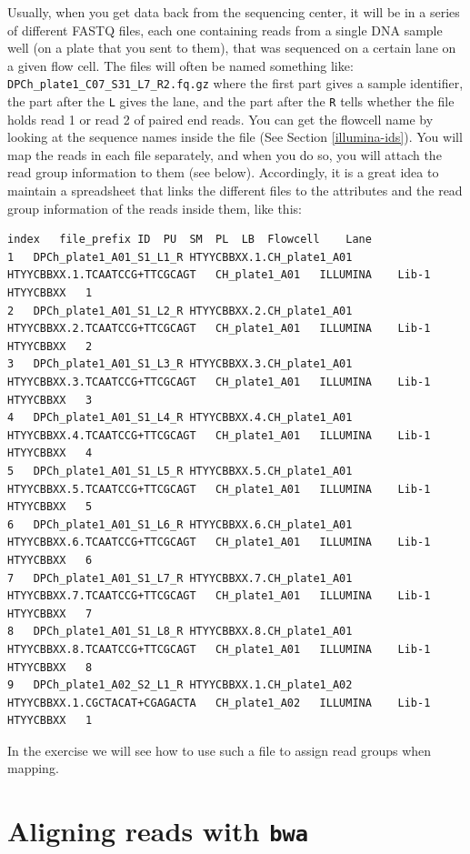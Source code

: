 \documentclass[]{krantz}
\begin{document}
Usually, when you get data back from the sequencing center, it will be in a series
of different FASTQ files, each one containing reads from a single DNA sample well (on a plate
that you sent to them), that was sequenced on a certain lane on a given flow cell. The files
will often be named something like: \texttt{DPCh\_plate1\_C07\_S31\_L7\_R2.fq.gz} where the first part
gives a sample identifier, the part after the \texttt{L} gives the lane, and the part after the
\texttt{R} tells whether the file holds read 1 or read 2 of paired end reads. You can get the flowcell
name by looking at the sequence names inside the file (See Section \ref{illumina-ids}). You
will map the reads in each file separately, and when you do so, you will attach the read group
information to them (see below). Accordingly, it is a great idea to maintain a spreadsheet
that links the different files to the attributes and the read group information of the reads inside
them, like this:

\begin{verbatim}
index   file_prefix ID  PU  SM  PL  LB  Flowcell    Lane
1   DPCh_plate1_A01_S1_L1_R HTYYCBBXX.1.CH_plate1_A01   HTYYCBBXX.1.TCAATCCG+TTCGCAGT   CH_plate1_A01   ILLUMINA    Lib-1   HTYYCBBXX   1
2   DPCh_plate1_A01_S1_L2_R HTYYCBBXX.2.CH_plate1_A01   HTYYCBBXX.2.TCAATCCG+TTCGCAGT   CH_plate1_A01   ILLUMINA    Lib-1   HTYYCBBXX   2
3   DPCh_plate1_A01_S1_L3_R HTYYCBBXX.3.CH_plate1_A01   HTYYCBBXX.3.TCAATCCG+TTCGCAGT   CH_plate1_A01   ILLUMINA    Lib-1   HTYYCBBXX   3
4   DPCh_plate1_A01_S1_L4_R HTYYCBBXX.4.CH_plate1_A01   HTYYCBBXX.4.TCAATCCG+TTCGCAGT   CH_plate1_A01   ILLUMINA    Lib-1   HTYYCBBXX   4
5   DPCh_plate1_A01_S1_L5_R HTYYCBBXX.5.CH_plate1_A01   HTYYCBBXX.5.TCAATCCG+TTCGCAGT   CH_plate1_A01   ILLUMINA    Lib-1   HTYYCBBXX   5
6   DPCh_plate1_A01_S1_L6_R HTYYCBBXX.6.CH_plate1_A01   HTYYCBBXX.6.TCAATCCG+TTCGCAGT   CH_plate1_A01   ILLUMINA    Lib-1   HTYYCBBXX   6
7   DPCh_plate1_A01_S1_L7_R HTYYCBBXX.7.CH_plate1_A01   HTYYCBBXX.7.TCAATCCG+TTCGCAGT   CH_plate1_A01   ILLUMINA    Lib-1   HTYYCBBXX   7
8   DPCh_plate1_A01_S1_L8_R HTYYCBBXX.8.CH_plate1_A01   HTYYCBBXX.8.TCAATCCG+TTCGCAGT   CH_plate1_A01   ILLUMINA    Lib-1   HTYYCBBXX   8
9   DPCh_plate1_A02_S2_L1_R HTYYCBBXX.1.CH_plate1_A02   HTYYCBBXX.1.CGCTACAT+CGAGACTA   CH_plate1_A02   ILLUMINA    Lib-1   HTYYCBBXX   1
\end{verbatim}

In the exercise we will see how to use such a file to assign read groups when mapping.

\hypertarget{aligning-reads-with-bwa}{%
\section{\texorpdfstring{Aligning reads with \texttt{bwa}}{Aligning reads with bwa}}\label{aligning-reads-with-bwa}}
\end{document}
